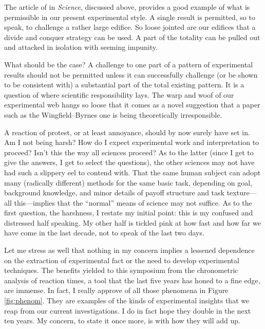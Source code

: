 \documentclass{paper}
\newcounter{oldpagecounter}
\newcommand\oldpage{\stepcounter{oldpagecounter}\marginpar{\footnotesize{\textcolor{mygrey}{pg. \arabic{oldpagecounter}}}}}
\begin{document}
The article of \citeauthor*{WingfieldByrnes1972} in \textit{Science}, discussed above, provides a good example of what is permissible in our present experimental style. A single result is permitted, so to speak, to challenge a rather large edifice. So loose jointed are our edifices that a divide and conquer strategy can be used. A part of the totality can be pulled out and attacked in isolation with seeming impunity.

What should be the case? A challenge to one part of a pattern of experimental results should not be permitted unless it can successfully challenge (or be shown to be consistent with) a substantial part of the total existing pattern. It is a question of where scientific responsibility lays. The warp and woof of our experimental web hangs so loose that it comes as a novel suggestion that a paper such as the Wingfield--Byrnes one is being theoretically irresponsible. 

A reaction of protest, or at least annoyance, should by now surely have set in. Am I not being harsh? How do I expect experimental work and interpretation to proceed? Isn't this the way all sciences proceed? As to the latter (since I get to give the answers, I get to select the questions), the other sciences may not have had such a slippery eel to contend with. That the same human subject can adopt many (radically different) methods for the same basic task, depending on goal, background knowledge, and minor details of payoff structure and task texture---all this---implies that the ``normal'' means of science may not suffice. As to the first question, the harshness, I restate my initial point: this is my confused and distressed half speaking. My other half is tickled pink at how fast and how far we have come in the last decade, not to speak of the last two days.

Let me stress as well that nothing in my concern implies a lessened dependence on the extraction of experimental fact or the need to develop experimental techniques. The benefits yielded to this symposium \oldpage from the chronometric analysis of reaction times, a tool that the last five years has honed to a fine edge, are immense. In fact, I really approve of all those phenomena in Figure \ref{fig:phenom}. They are examples of the kinds of experimental insights that we reap from our current investigations. I do in fact hope they double in the next ten years. My concern, to state it once more, is with how they will add up.
\end{document}
